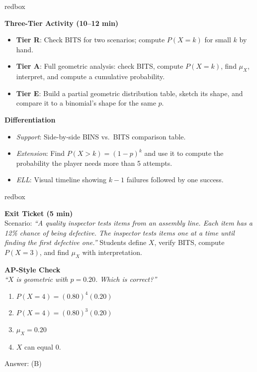 \documentclass[10pt]{article}
\begin{document}
\begin{skillbox}{redbox}
\begin{minipage}[t]{0.48\linewidth}
    \textbf{Three-Tier Activity (10--12 min)}
    \begin{itemize}
        \item \textbf{Tier R}: Check BITS for two scenarios; compute $P(X = k)$
              for small $k$ by hand.
        \item \textbf{Tier A}: Full geometric analysis: check BITS, compute
              $P(X = k)$, find $\mu_X$, interpret, and compute a cumulative
              probability.
        \item \textbf{Tier E}: Build a partial geometric distribution table,
              sketch its shape, and compare it to a binomial's shape for the
              same $p$.
    \end{itemize}
\end{minipage}
\hfill
\begin{minipage}[t]{0.48\linewidth}
    \textbf{Differentiation}
    \begin{itemize}
        \item \textit{Support}: Side-by-side BINS vs.\ BITS comparison table.
        \item \textit{Extension}: Find $P(X > k) = (1-p)^k$ and use it to
              compute the probability the player needs more than 5 attempts.
        \item \textit{ELL}: Visual timeline showing $k-1$ failures followed by
              one success.
    \end{itemize}
\end{minipage}
\end{skillbox}

\begin{skillbox}{redbox}
\begin{minipage}[t]{0.48\linewidth}
    \textbf{Exit Ticket (5 min)}\\
    Scenario: \textit{``A quality inspector tests items from an assembly line.
    Each item has a 12\% chance of being defective. The inspector tests items
    one at a time until finding the first defective one.''} Students define $X$,
    verify BITS, compute $P(X = 3)$, and find $\mu_X$ with interpretation.
\end{minipage}
\hfill
\begin{minipage}[t]{0.48\linewidth}
    \textbf{AP-Style Check}\\
    \textit{``$X$ is geometric with $p = 0.20$. Which is correct?''}
    \begin{enumerate}[label=(\Alph*)]
        \item $P(X = 4) = (0.80)^4(0.20)$
        \item $P(X = 4) = (0.80)^3(0.20)$
        \item $\mu_X = 0.20$
        \item $X$ can equal $0$.
    \end{enumerate}
    Answer: (B)
\end{minipage}
\end{skillbox}
\end{document}
